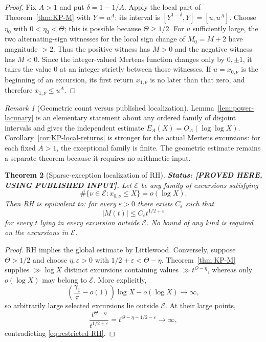 \documentclass[11pt]{amsart}
\numberwithin{equation}{section}
\theoremstyle{plain}
\newtheorem{theorem}{Theorem}[section]
\theoremstyle{definition}
\theoremstyle{remark}
\newtheorem{remark}[theorem]{Remark}
\begin{document}
\begin{proof}
Fix $A>1$ and put $\delta=1-1/A$. Apply the local part of
Theorem~\ref{thm:KP-M} with $Y=u^A$; its interval is
$[Y^{1-\delta},Y]=[u,u^A]$. Choose $\eta_0$ with
$0<\eta_0<\Theta$; this is possible because $\Theta\ge1/2$. For $u$
sufficiently large, the two alternating-sign witnesses for the local sign
change of $M_0=M+2$ have magnitude $>2$. Thus the positive witness has
$M>0$ and the negative witness has $M<0$. Since the integer-valued Mertens
function changes only by $0,\pm1$, it takes the value $0$ at an integer
strictly between those witnesses. If $u=x_{0,\nu}$ is the beginning of an
excursion, its first return $x_{1,\nu}$ is no later than that zero, and
therefore $x_{1,\nu}\le u^A$.
\end{proof}

\begin{remark}[Geometric count versus published localization]
Lemma~\ref{lem:power-lacunary} is an elementary statement about any ordered
family of disjoint intervals and gives the independent estimate
$E_A(X)=O_A(\log\log X)$. Corollary~\ref{cor:KP-local-returns} is stronger
for the actual Mertens excursions: for each fixed $A>1$, the exceptional
family is finite. The geometric estimate remains a separate theorem because
it requires no arithmetic input.
\end{remark}

\begin{theorem}[Sparse-exception localization of RH]
\label{thm:sparse-RH}
\textbf{Status: [PROVED HERE, USING PUBLISHED INPUT].} Let $\mathcal E$ be any family of excursions satisfying
\[
\#\{\nu\in\mathcal E:x_{0,\nu}\le X\}=o(\log X).
\]
Then RH is equivalent to: for every $\varepsilon>0$ there exists
$C_\varepsilon$ such that
\begin{equation}
\label{eq:restricted-RH}
|M(t)|\le C_\varepsilon t^{1/2+\varepsilon}
\end{equation}
for every $t$ lying in every excursion outside $\mathcal E$. No bound of any
kind is required on the excursions in $\mathcal E$.
\end{theorem}

\begin{proof}
RH implies the global estimate by Littlewood. Conversely, suppose
$\Theta>1/2$ and choose $\eta,\varepsilon>0$ with
$1/2+\varepsilon<\Theta-\eta$. Theorem~\ref{thm:KP-M} supplies
$\gg\log X$ distinct excursions containing values
$\gg t^{\Theta-\eta}$, whereas only $o(\log X)$ may belong to $\mathcal E$.
More explicitly,
\[
\left(\frac{\gamma_1}{\pi}-o(1)\right)\log X-o(\log X)\longrightarrow\infty,
\]
so arbitrarily large selected excursions lie outside $\mathcal E$.  At their
large points,
\[
\frac{t^{\Theta-\eta}}{t^{1/2+\varepsilon}}
=t^{\Theta-\eta-1/2-\varepsilon}\longrightarrow\infty,
\]
contradicting \eqref{eq:restricted-RH}.
\end{proof}
\end{document}
